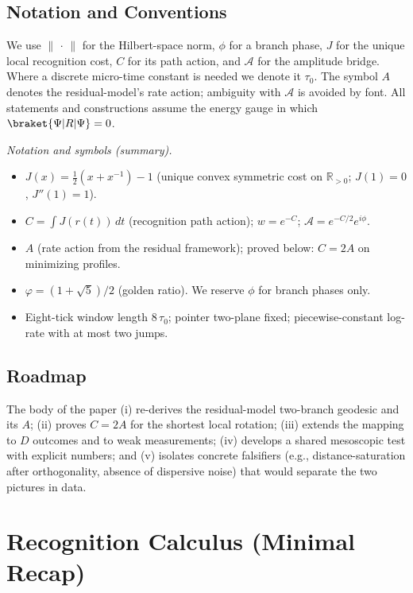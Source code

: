 \documentclass[11pt,letterpaper]{article}
\theoremstyle{definition}
\begin{document}
\subsection{Notation and Conventions}

We use $\|\,\cdot\,\|$ for the Hilbert-space norm, $\phi$ for a branch phase, $J$ for the unique local recognition cost, $C$ for its path action, and $\mathcal{A}$ for the amplitude bridge. Where a discrete micro-time constant is needed we denote it $\tau_0$. The symbol $A$ denotes the residual-model's rate action; ambiguity with $\mathcal{A}$ is avoided by font. All statements and constructions assume the energy gauge in which $\braket{\Psi|R|\Psi}=0$.

\medskip
\noindent\textit{Notation and symbols (summary).}
\begin{itemize}
  \item $J(x)=\tfrac12(x+x^{-1})-1$ (unique convex symmetric cost on $\mathbb R_{>0}$; $J(1)=0$, $J''(1)=1$).
  \item $C=\int J(r(t))\,dt$ (recognition path action); $w=e^{-C}$; $\mathcal A=e^{-C/2}e^{i\phi}$.
  \item $A$ (rate action from the residual framework); proved below: $C=2A$ on minimizing profiles.
  \item $\varphi=(1+\sqrt5)/2$ (golden ratio). We reserve $\phi$ for branch phases only.
  \item Eight-tick window length $8\,\tau_0$; pointer two-plane fixed; piecewise-constant log-rate with at most two jumps.
\end{itemize}

\subsection{Roadmap}

The body of the paper (i) re-derives the residual-model two-branch geodesic and its $A$; (ii) proves $C=2A$ for the shortest local rotation; (iii) extends the mapping to $D$ outcomes and to weak measurements; (iv) develops a shared mesoscopic test with explicit numbers; and (v) isolates concrete falsifiers (e.g., distance-saturation after orthogonality, absence of dispersive noise) that would separate the two pictures in data.

\section{Recognition Calculus (Minimal Recap)}
\end{document}
